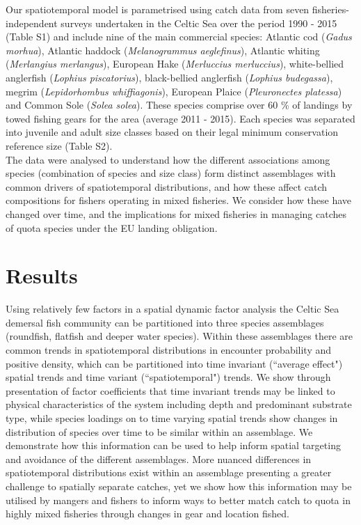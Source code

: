 \documentclass[fleqn,10pt]{wlscirep}
\begin{document}
\begin{linenumbers}
Our spatiotemporal model is parametrised using catch data from seven
fisheries-independent surveys undertaken in the Celtic Sea over the period 1990
- 2015 (Table S1) and include nine of the main commercial species: Atlantic cod
(\textit{Gadus morhua}), Atlantic haddock (\textit{Melanogrammus aeglefinus}),
Atlantic whiting (\textit{Merlangius merlangus}), European Hake
(\textit{Merluccius merluccius}), white-bellied anglerfish (\textit{Lophius
	piscatorius}), black-bellied anglerfish (\textit{Lophius budegassa}),
megrim (\textit{Lepidorhombus whiffiagonis}), European Plaice
(\textit{Pleuronectes platessa}) and Common Sole (\textit{Solea solea}). These
species comprise over 60 \% of landings by towed fishing gears for the area
(average 2011 - 2015\cite{STECF2017}). Each species was separated into juvenile
and adult size classes based on their legal minimum conservation reference size
(Table S2).\\

The data were analysed to understand how the different associations among
species (combination of species and size class) form distinct assemblages with
common drivers of spatiotemporal distributions, and how these affect catch
compositions for fishers operating in mixed fisheries. We consider how these
have changed over time, and the implications for mixed fisheries in managing
catches of quota species under the EU landing obligation.\\

\section*{Results\\}

Using relatively few factors in a spatial dynamic factor analysis the Celtic
Sea demersal fish community can be partitioned into three species assemblages
(roundfish, flatfish and deeper water species).  Within these assemblages there
are common trends in spatiotemporal distributions in encounter probability and
positive density, which can be partitioned into time invariant (``average
effect") spatial trends and time variant (``spatiotemporal") trends. We show
through presentation of factor coefficients that time invariant trends may be
linked to physical characteristics of the system including depth and
predominant substrate type, while species loadings on to time varying spatial
trends show changes in distribution of species over time to be similar within
an assemblage. We demonstrate how this information can be used to help inform
spatial targeting and avoidance of the different assemblages. More nuanced
differences in spatiotemporal distributions exist within an assemblage
presenting a greater challenge to spatially separate catches, yet we show how
this information may be utilised by mangers and fishers to inform ways to
better match catch to quota in highly mixed fisheries through changes in gear
and location fished.


\end{linenumbers}
\end{document}
